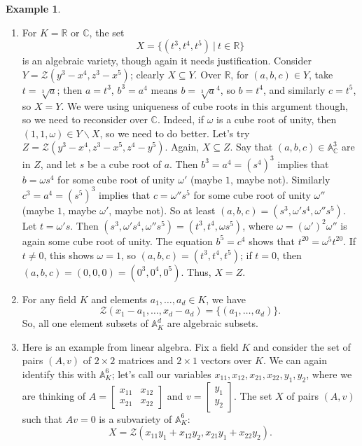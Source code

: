 \documentclass{amsart}[12pt]
\newcommand{\A}{\mathbb{A}}
\newcommand{\R}{{\mathbb{R}}}
\newcommand{\C}{\mathbb{C}}
\newcommand{\cZ}{\mathcal{Z}}
\numberwithin{equation}{section}
\theoremstyle{plain} %
\theoremstyle{definition}
\newtheorem{ex}[equation]{Example}
\theoremstyle{remark}
\begin{document}
\begin{ex}
\begin{enumerate}
\item For $K = \mathbb{R}$ or $\C$, the set
\[ X= \{ (t^3,t^4,t^5) \ | \ t\in \R\} \] is an algebraic variety, though again it needs justification. Consider $Y=\cZ(y^3-x^4,z^3-x^5)$; clearly $X\subseteq Y$. Over $\R$, for $(a,b,c)\in Y$, take $t=\sqrt[3]{a}$; then $a=t^3$, $b^3=a^4$ means $b=\sqrt[3]{a}^4$, so $b=t^4$, and similarly $c=t^5$, so $X=Y$. We were using uniqueness of cube roots in this argument though, so we need to reconsider over $\C$. Indeed, if $\omega$ is a cube root of unity, then $(1,1,\omega)\in Y\smallsetminus X$, so we need to do better. Let's try $Z=\cZ(y^3-x^4,z^3-x^5,z^4-y^5)$. Again, $X\subseteq Z$. Say that $(a,b,c)\in \A^3_{\C}$ are in $Z$, and let $s$ be a cube root of $a$. Then $b^3=a^4 = (s^4)^3$ implies that $b=\omega s^4$ for some cube root of unity $\omega'$ (maybe $1$, maybe not). Similarly $c^3=a^4= (s^5)^3$ implies that $c=\omega'' s^5$ for some cube root of unity $\omega''$ (maybe $1$, maybe $\omega'$, maybe not). So at least $(a,b,c)=(s^3,\omega' s^4, \omega'' s^5)$. Let $t=\omega' s$. Then $(s^3,\omega' s^4, \omega'' s^5) = (t^3,t^4, \omega s^5)$, where $\omega= (\omega')^2 \omega''$ is again some cube root of unity. The equation $b^5=c^4$ shows that $t^20 = \omega^5 t^20$. If $t\neq 0$, this shows $\omega=1$, so $(a,b,c)=(t^3,t^4,t^5)$; if $t=0$, then $(a,b,c) = (0,0,0) = (0^3,0^4,0^5)$. Thus, $X=Z$.

\item For any field $K$ and elements $a_1, \dots, a_d \in K$, we have
\[\mathcal{Z}(x_1 - a_1, \dots, x_d -a_d) = \{(a_1, \dots, a_d)\}.\]
So, all one element subsets of $\A^d_K$ are algebraic subsets. 

\item Here is an example from linear algebra. Fix a field $K$ and consider the set of pairs $(A,v)$ of $2\times 2$ matrices and $2\times 1$ vectors over $K$. We can again identify this with $\A^6_K$; let's call our variables $x_{11}, x_{12}, x_{21}, x_{22}, y_1, y_2$, where we are thinking of $A= \begin{bmatrix} x_{11} & x_{12} \\ x_{21}& x_{22}\end{bmatrix}$ and $v= \begin{bmatrix} y_1 \\ y_2\end{bmatrix}$. The set $X$ of pairs $(A,v)$ such that $Av=0$ is a subvariety of $\A^6_K$:
\[ X = \cZ( x_{11} y_1 + x_{12} y_2, x_{21} y_1 + x_{22} y_2 ).\]



\end{enumerate}
\end{ex}
\end{document}
